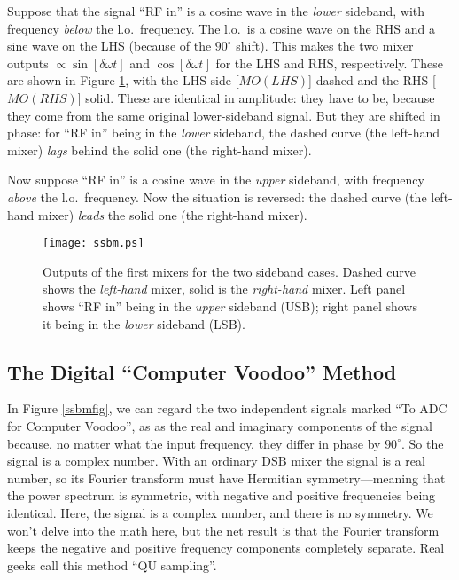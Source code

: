 \documentclass[11pt,preprint]{aastex}
\begin{document}
Suppose that the signal ``RF in'' is a cosine wave in the {\it lower}
sideband, with frequency {\it below} the l.o.\ frequency. The l.o.\ is a
cosine wave on the RHS and a sine wave on the LHS (because of the
$90^\circ$ shift). This makes the two mixer outputs $\propto \sin
[\delta \omega t]$ and $\cos [\delta \omega t]$ for the LHS and RHS,
respectively. These are shown in Figure \ref{mixerout}, with the LHS
side [$MO(LHS)$] dashed and the RHS [$MO(RHS)$] solid. These are
identical in amplitude: they have to be, because they come from the same
original lower-sideband signal. But they are shifted in phase: for ``RF
in'' being in the {\it lower} sideband, the dashed curve (the left-hand
mixer) {\it lags} behind the solid one (the right-hand mixer).

Now suppose ``RF in'' is a cosine wave in the {\it upper} sideband, with
frequency {\it above} the l.o.\ frequency. Now the situation is
reversed: the dashed curve (the left-hand mixer) {\it leads} the solid
one (the right-hand mixer).


\begin{figure}[h]
\hspace{-0.5in}
        \texttt{[image: ssbm.ps]}
\caption{Outputs of the first mixers for the two sideband cases. Dashed
  curve shows the {\it left-hand} mixer, solid is the {\it right-hand}
  mixer. Left panel shows ``RF in'' being in the {\it upper} sideband
  (USB); right panel shows it being in the {\it lower} sideband (LSB).
\label{mixerout}}
\end{figure}

\subsection{The Digital ``Computer Voodoo'' Method}

In Figure \ref{ssbmfig}, we can regard the two independent signals
marked ``To ADC for Computer Voodoo'', as as the real and imaginary
components of the signal because, no matter what the input frequency,
they differ in phase by $90^\circ$. So the signal is a complex
number. With an ordinary DSB mixer the signal is a real number, so its
Fourier transform must have Hermitian symmetry---meaning that the power
spectrum is symmetric, with negative and positive frequencies being
identical. Here, the signal is a complex number, and there is no
symmetry. We won't delve into the math here, but the net result is that
the Fourier transform keeps the negative and positive frequency
components completely separate. Real geeks call this method ``QU
sampling''. 
\end{document}
